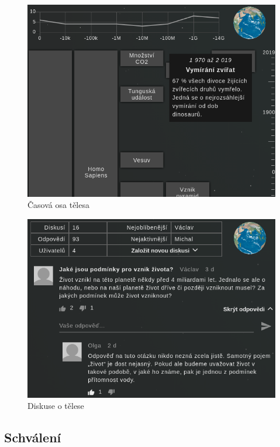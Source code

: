 \documentclass[a4paper,12pt]{article}
\begin{document}
\begin{figure}[H]
\begin{center}
\includegraphics[width=350pt]{Images/Timeline.png}
\caption{Časová osa tělesa}
\end{center}
\end{figure}

\begin{figure}[H]
\begin{center}
\includegraphics[width=350pt]{Images/Discussion.png}
\caption{Diskuse o tělese}
\end{center}
\end{figure}

\vspace*{-1cm}
\subsection{Schválení}
\end{document}
